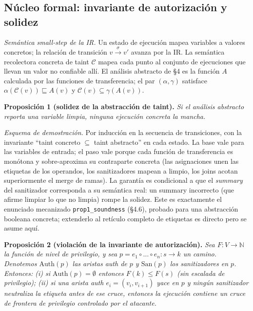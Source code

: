 \documentclass[11pt]{article}
\begin{document}
\subsection{Núcleo formal: invariante de autorización y solidez}
\emph{Semántica small-step de la IR.} Un estado de ejecución mapea variables a
valores concretos; la relación de transición $v \xrightarrow{\sigma} v'$ avanza
por la IR. La semántica recolectora concreta de taint $\mathcal{C}$ mapea cada
punto al conjunto de ejecuciones que llevan un valor no confiable allí. El
análisis abstracto de \S4 es la función $A$ calculada por las funciones de
transferencia; el par $(\alpha, \gamma)$ satisface
$\alpha(\mathcal{C}(v)) \sqsubseteq A(v)$ y
$\mathcal{C}(v) \subseteq \gamma(A(v))$.

\smallskip
\noindent\textbf{Proposición 1 (solidez de la abstracción de taint).} \emph{Si
el análisis abstracto reporta una variable limpia, ninguna ejecución concreta la
mancha.}

\noindent\emph{Esquema de demostración.} Por inducción en la secuencia de
transiciones, con la invariante ``taint concreto $\subseteq$ taint abstracto'' en
cada estado. La base vale para las variables de entrada; el paso vale porque cada
función de transferencia es monótona y sobre-aproxima su contraparte concreta (las
asignaciones unen las etiquetas de los operandos, los sanitizadores mapean a
limpio, los joins acotan superiormente el merge de ramas). La garantía es
condicional a que el \emph{summary} del sanitizador corresponda a su semántica
real: un summary incorrecto (que afirme limpiar lo que no limpia) rompe la
solidez. Este es exactamente el enunciado mecanizado \texttt{prop1\_soundness}
(\S4.6), probado para una abstracción booleana concreta; extenderlo al retículo
completo de etiquetas es directo pero se asume aquí.

\smallskip
\noindent\textbf{Proposición 2 (violación de la invariante de autorización).}
\emph{Sea $F : V \to \mathbb{N}$ la función de nivel de privilegio, y sea
$p = e_1 \circ \dots \circ e_n : s \to k$ un camino. Denotemos $\mathrm{Auth}(p)$
las aristas auth de $p$ y $\mathrm{San}(p)$ los sanitizadores en $p$. Entonces:
(i) si $\mathrm{Auth}(p) = \emptyset$ entonces $F(k) \le F(s)$ (sin escalada de
privilegio); (ii) si una arista auth $e_i = (v_i, v_{i+1})$ yace en $p$ y ningún
sanitizador neutraliza la etiqueta antes de ese cruce, entonces la ejecución
contiene un cruce de frontera de privilegio controlado por el atacante.}
\end{document}
